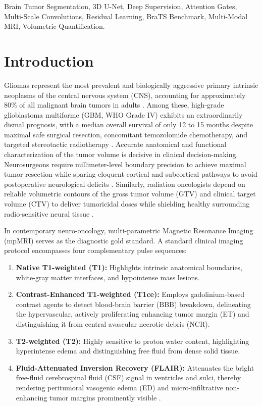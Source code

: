 \documentclass[conference]{IEEEtran}
\begin{document}
\begin{abstract}
presenting an effective, clinically translational decision-support system for neuro-oncology.
\end{abstract}

\begin{IEEEkeywords}
Brain Tumor Segmentation, 3D U-Net, Deep Supervision, Attention Gates, Multi-Scale Convolutions, Residual Learning, BraTS Benchmark, Multi-Modal MRI, Volumetric Quantification.
\end{IEEEkeywords}

\section{Introduction}
Gliomas represent the most prevalent and biologically aggressive primary intrinsic neoplasms of the central nervous system (CNS), accounting for approximately 80\% of all malignant brain tumors in adults \cite{ostrom2021cbtrus}. Among these, high-grade glioblastoma multiforme (GBM, WHO Grade IV) exhibits an extraordinarily dismal prognosis, with a median overall survival of only 12 to 15 months despite maximal safe surgical resection, concomitant temozolomide chemotherapy, and targeted stereotactic radiotherapy \cite{stupp2005radiotherapy}. Accurate anatomical and functional characterization of the tumor volume is decisive in clinical decision-making. Neurosurgeons require millimeter-level boundary precision to achieve maximal tumor resection while sparing eloquent cortical and subcortical pathways to avoid postoperative neurological deficits \cite{lacroix2001multivariate}. Similarly, radiation oncologists depend on reliable volumetric contours of the gross tumor volume (GTV) and clinical target volume (CTV) to deliver tumoricidal doses while shielding healthy surrounding radio-sensitive neural tissue \cite{louis2021who}.

In contemporary neuro-oncology, multi-parametric Magnetic Resonance Imaging (mpMRI) serves as the diagnostic gold standard. A standard clinical imaging protocol encompasses four complementary pulse sequences:
\begin{enumerate}
    \item \textbf{Native T1-weighted (T1):} Highlights intrinsic anatomical boundaries, white-gray matter interfaces, and hypointense mass lesions.
    \item \textbf{Contrast-Enhanced T1-weighted (T1ce):} Employs gadolinium-based contrast agents to detect blood-brain barrier (BBB) breakdown, delineating the hypervascular, actively proliferating enhancing tumor margin (ET) and distinguishing it from central avascular necrotic debris (NCR).
    \item \textbf{T2-weighted (T2):} Highly sensitive to proton water content, highlighting hyperintense edema and distinguishing free fluid from dense solid tissue.
    \item \textbf{Fluid-Attenuated Inversion Recovery (FLAIR):} Attenuates the bright free-fluid cerebrospinal fluid (CSF) signal in ventricles and sulci, thereby rendering peritumoral vasogenic edema (ED) and micro-infiltrative non-enhancing tumor margins prominently visible \cite{menze2015multimodal}.
\end{enumerate}
\end{document}
